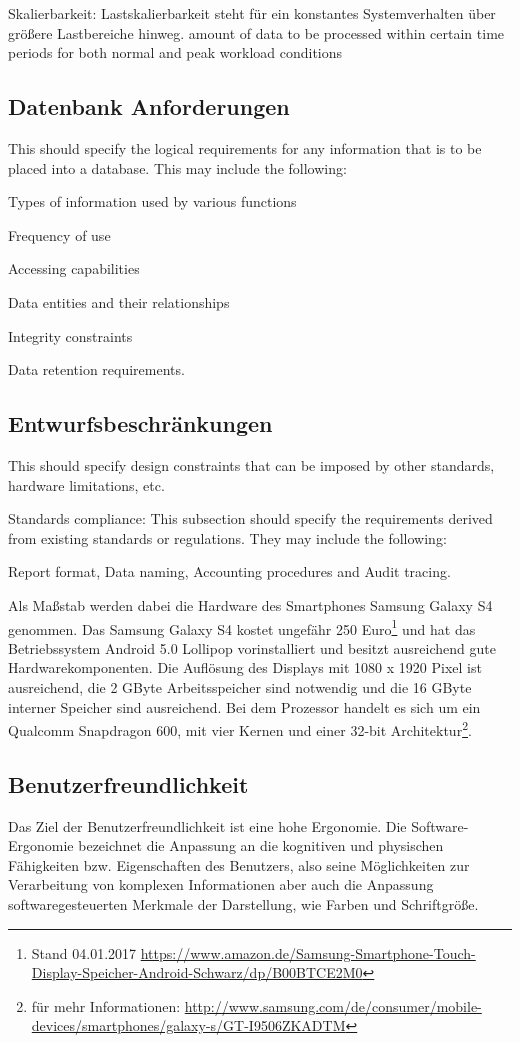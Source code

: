 {		Skalierbarkeit: Lastskalierbarkeit steht für ein konstantes Systemverhalten über größere Lastbereiche hinweg. amount of data to be processed within certain time periods for both normal and peak workload conditions

	\subsection{Datenbank Anforderungen}
		This should specify the logical requirements for any information that is to be placed into a database. This may include the following:
		
		Types of information used by various functions
		
		Frequency of use
		
		Accessing capabilities
		
		Data entities and their relationships
		
		Integrity constraints
		
		Data retention requirements.
	
	\subsection{Entwurfsbeschränkungen}
		This should specify design constraints that can be imposed by other standards, hardware limitations, etc.
		
		Standards compliance: This subsection should specify the requirements derived from existing standards or regulations. They may include the following: 
		
		Report format, Data naming, Accounting procedures and Audit tracing.
		
		Als Maßstab werden dabei die Hardware des Smartphones Samsung Galaxy S4 genommen. Das Samsung Galaxy S4 kostet ungefähr 250 Euro\footnote{Stand 04.01.2017 \url{https://www.amazon.de/Samsung-Smartphone-Touch-Display-Speicher-Android-Schwarz/dp/B00BTCE2M0}} und hat das Betriebssystem Android 5.0 Lollipop vorinstalliert und besitzt ausreichend gute Hardwarekomponenten. Die Auflösung des Displays mit 1080 x 1920 Pixel ist ausreichend, die 2 GByte Arbeitsspeicher sind notwendig und die 16 GByte interner Speicher sind ausreichend. Bei dem Prozessor handelt es sich um ein Qualcomm Snapdragon 600, mit vier Kernen und einer 32-bit Architektur\footnote{für mehr Informationen: \url{http://www.samsung.com/de/consumer/mobile-devices/smartphones/galaxy-s/GT-I9506ZKADTM}}.
	
	\subsection{Benutzerfreundlichkeit}
		Das Ziel der Benutzerfreundlichkeit ist eine hohe Ergonomie. Die Software-Ergonomie bezeichnet die Anpassung an die kognitiven und physischen Fähigkeiten bzw. Eigenschaften des Benutzers, also seine Möglichkeiten zur Verarbeitung von komplexen Informationen aber auch die Anpassung softwaregesteuerten Merkmale der Darstellung, wie Farben und Schriftgröße.
		
}

